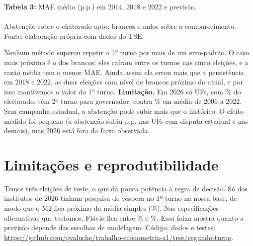 \documentclass[10pt,a4paper]{article}
\begin{document}
\begin{center}\small
\textbf{Tabela 3:} MAE médio (p.p.) em 2014, 2018 e 2022 e previsão.\\[1pt]
\\[1pt]
{\footnotesize Abstenção sobre o eleitorado apto; brancos e nulos sobre o comparecimento. Fonte: elaboração própria com dados do TSE.}
\end{center}

Nenhum método superou repetir o 1º turno por mais de um erro-padrão. O caso mais próximo é o dos brancos: eles caíram entre os turnos nas cinco eleições, e a razão média tem o menor MAE. Ainda assim ela errou mais que a persistência em 2018 e 2022, as duas eleições com nível de brancos próximo do atual, e por isso mantivemos o valor do 1º turno.
\textbf{Limitação.} Em 2026 só \govNVinteSeis{} UFs, com \govShareVinteSeis\% do eleitorado, têm 2º turno para governador, contra \govShareHist\% em média de 2006 a 2022. Sem campanha estadual, a abstenção pode subir mais que o histórico. O efeito medido foi pequeno (a abstenção subiu \deltaAbstCom{} p.p. nas UFs com disputa estadual e \deltaAbstSem{} nas demais), mas 2026 está fora da faixa observada.

\section{Limitações e reprodutibilidade}
Temos três eleições de teste, o que dá pouca potência à regra de decisão. Só \nInstUmT{} dos \nInst{} institutos de 2026 tinham pesquisa de véspera no 1º turno na nossa base, de modo que o M2 fica próximo da média simples (\sensMZero\%). Nas \nSens{} especificações alternativas que testamos, Flávio fica entre \sensMin\% e \sensMax\%. Essa faixa mostra quanto a previsão depende das escolhas de modelagem. Código, dados e testes: \url{https://github.com/pvaluche/trabalho-econometria-a1/tree/segundo-turno}.
\end{document}
